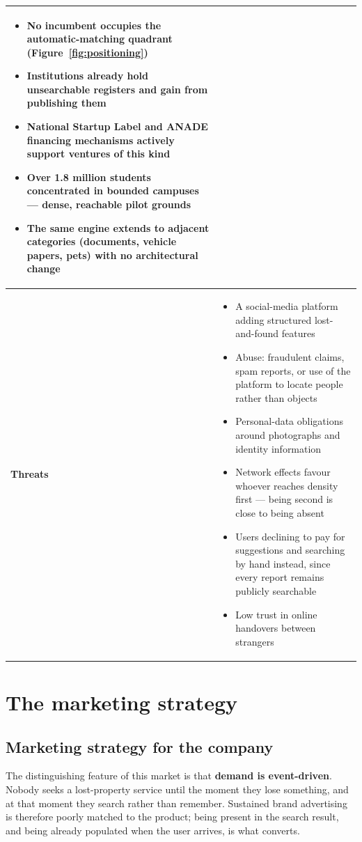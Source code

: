 \begin{table}[htbp]
\begin{tabularx}{\textwidth}{@{}>{\bfseries}p{2.75cm} >{\cellstartslist}X@{}}
\begin{itemize}[leftmargin=1em,nosep,topsep=2pt]
        connected
  \item No incumbent occupies the automatic-matching quadrant
        (Figure~\ref{fig:positioning})
  \item Institutions already hold unsearchable registers and gain from
        publishing them
  \item National Startup Label and ANADE financing mechanisms actively support
        ventures of this kind~\cite{startupdz,anade2025}
  \item Over 1.8 million students~\cite{mesrs2025} concentrated in bounded
        campuses --- dense, reachable pilot grounds
  \item The same engine extends to adjacent categories (documents, vehicle
        papers, pets) with no architectural change
\end{itemize} \\
\midrule
Threats &
\begin{itemize}[leftmargin=1em,nosep,topsep=2pt]
  \item A social-media platform adding structured lost-and-found features
  \item Abuse: fraudulent claims, spam reports, or use of the platform to locate
        people rather than objects
  \item Personal-data obligations around photographs and identity information
  \item Network effects favour whoever reaches density first --- being second is
        close to being absent
  \item Users declining to pay for suggestions and searching by hand
        instead, since every report remains publicly searchable
  \item Low trust in online handovers between strangers
\end{itemize} \\
\bottomrule
\end{tabularx}
\end{table}

\section{The marketing strategy}
\label{sec:marketing}

\subsection{Marketing strategy for the company}

The distinguishing feature of this market is that \textbf{demand is
event-driven}. Nobody seeks a lost-property service until the moment they lose
something, and at that moment they search rather than remember. Sustained
brand advertising is therefore poorly matched to the product; being present in
the search result, and being already populated when the user arrives, is what
converts.


